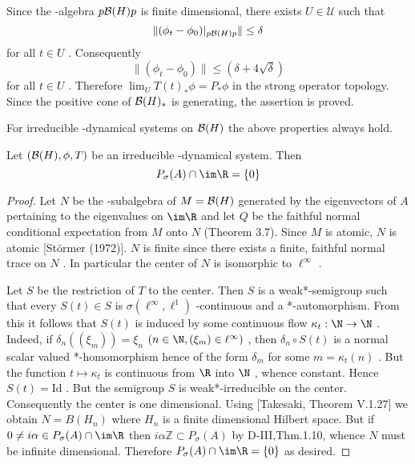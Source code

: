 Since the \WA-algebra $ p \mathcal{B}(H) p $  is finite dimensional, there exists $ U \in \mathcal{U} $  such that
\[
	\|(\phi_{t} - \phi_{0})|_{p \mathcal{B}(H) p}\| \leq \delta
\]
for all $ t \in U $ .
Consequently
\[
\|(\phi_{t} - \phi_{0})\| \leq (\delta + 4\sqrt{\delta})
\]
for all $ t \in U $ .
Therefore $ \lim_{U} T(t)_{*}\phi = P_{*}\phi $  in the strong operator topology.
Since the positive cone of $ \mathcal{B}(H)_{*} $  is generating, the assertion is proved.

For irreducible \WA-dynamical systems on $ \mathcal{B}(H) $  the above properties always hold.
\begin{theorem}\label{thm:d4-3.8}
Let $ (\mathcal{B}(H),\phi,T) $  be an irreducible \WA-dynamical system.
Then
\[
P_{\sigma}(A) \cap \im\R = \{0\}
\]
\end{theorem}

\newpage

\begin{proof}
Let $ N $  be the \WA-subalgebra of $ M = \mathcal{B}(H) $  generated by the eigenvectors of $ A $  pertaining to the eigenvalues on $ \im\R $  and let $ Q $  be the faithful normal conditional expectation from $ M $  onto $ N $  (Theorem 3.7).
Since $ M $  is atomic, $ N $  is atomic [Störmer (1972)].
$ N $  is finite since there exists a finite, faithful normal trace on $ N $ .
In particular the center of $ N $  is isomorphic to $ \ell^{\infty} $ .

Let $ S $  be the restriction of $ T $  to the center.
Then $ S $  is a weak*-semigroup such that every $ S(t) \in S $  is $ \sigma(\ell^{\infty},\ell^{1}) $ -continuous and a *-automorphism.
From this it follows that $ S(t) $  is induced by some continuous flow $ \kappa_{t}: \N \to \N $ .
Indeed, if $ \delta_{n}((\xi_{m})) = \xi_{n} $  $ (n \in \N, (\xi_{m}) \in \ell^{\infty}) $ , then $ \delta_{n} \circ S(t) $  is a normal scalar valued *-homomorphism hence of the form $ \delta_{m} $  for some $ m = \kappa_{t}(n) $ .
But the function $ t \mapsto \kappa_{t} $  is continuous from $ \R $  into $ \N $ , whence constant.
Hence $ S(t) = \text{Id} $ .
But the semigroup $ S $  is weak*-irreducible on the center.
Consequently the center is one dimensional.
Using [Takesaki, Theorem V.1.27] we obtain $ N = B(H_{n}) $  where $ H_{n} $  is a finite dimensional Hilbert space.
But if $ 0 \neq i\alpha \in P_{\sigma}(A) \cap \im\R $  then $ i\alpha\mathbb{Z} \subset P_{\sigma}(A) $  by D-III,Thm.1.10, whence $ N $  must be infinite dimensional.
Therefore $ P_{\sigma}(A) \cap \im\R = \{0\} $  as desired.
\end{proof}

